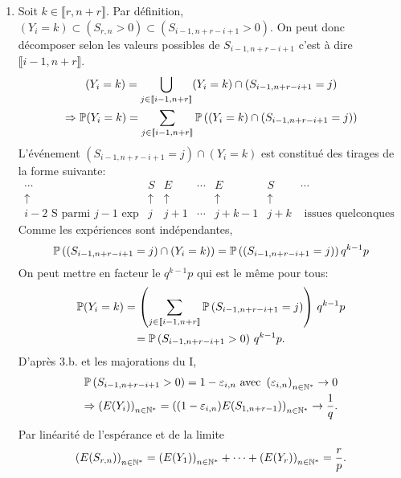 \begin{enumerate}
\begin{enumerate}
    \item Soit $k \in \llbracket r, n+r\rrbracket$. Par définition, $(Y_i = k) \subset (S_{r,n} >0)\subset (S_{i-1,n+r-i+1} >0)$. On peut donc décomposer selon les valeurs possibles de $S_{i-1,n+r-i+1}$ c'est à dire $\llbracket i-1, n+r\rrbracket$.
\begin{multline*}
  (Y_i = k) = \bigcup_{j \in \llbracket i-1, n+r\rrbracket}(Y_i = k)\cap \left( S_{i-1,n+r-i+1} = j\right) \\
  \Rightarrow
  \mathbb{P}(Y_i = k) = \sum_{j \in \llbracket i-1, n+r\rrbracket}\mathbb{P}\left((Y_i = k)\cap \left( S_{i-1,n+r-i+1} = j\right)\right)  
\end{multline*}
L'événement $ \left( S_{i-1,n+r-i+1} = j\right)\cap (Y_i = k)$ est constitué des tirages de la forme suivante:
\[
  \begin{matrix}
        \cdots                & S          & E        & \cdots & E          & S          & \cdots\\
    \uparrow                  & \uparrow   & \uparrow &        & \uparrow   & \uparrow   &  \\
i-2 \text{ S parmi $j-1$ exp} & j          & j+1      & \cdots & j+k-1      & j+k        & \text{ issues quelconques }
  \end{matrix}
\]
Comme les expériences sont indépendantes,
\[
  \mathbb{P}\left( \left( S_{i-1,n+r-i+1} = j\right)\cap (Y_i = k) \right)
  = \mathbb{P}\left( \left( S_{i-1,n+r-i+1} = j\right)\right) q^{k-1}p
\]
On peut mettre en facteur le $q^{k-1}p$ qui est le même pour tous:
\begin{multline*}
  \mathbb{P}(Y_i = k) = \left( \sum_{j \in \llbracket i-1, n+r\rrbracket}\mathbb{P}\left( S_{i-1,n+r-i+1} = j\right)\right)\,q^{k-1}p \\
  = \mathbb{P}\left( S_{i-1,n+r-i+1} > 0\right)\,q^{k-1}p.
\end{multline*}
D'après 3.b. et les majorations du I, 
\begin{multline*}
\mathbb{P}\left( S_{i-1,n+r-i+1} > 0\right) = 1 - \varepsilon_{i,n}
\text{ avec } 
\left( \varepsilon_{i,n} \right)_{n \in \mathbb{N}^*}\rightarrow 0\\
\Rightarrow 
\left( E(Y_i) \right)_{n \in \mathbb{N}^*}
=\left( (1 - \varepsilon_{i,n})E(S_{1,n+r-1}) \right)_{n \in \mathbb{N}^*}
\rightarrow \frac{1}{q}.
\end{multline*}
Par linéarité de l'espérance et de la limite
\[
\left( E(S_{r,n}) \right)_{n \in \mathbb{N}^*} =  \left( E(Y_1) \right)_{n \in \mathbb{N}^*} + \cdots + \left( E(Y_r) \right)_{n \in \mathbb{N}^*} = \frac{r}{p}.
\]
  \end{enumerate}
\end{enumerate}


